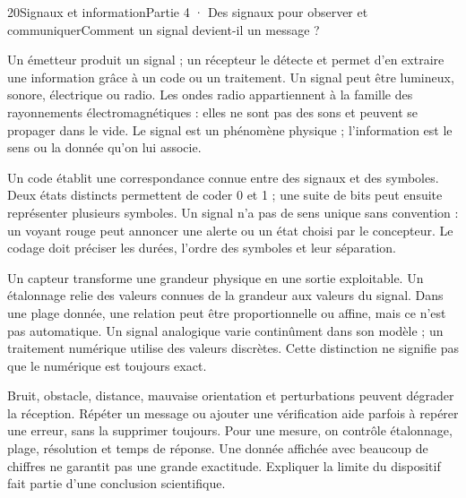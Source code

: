 \begin{ouverture}[college4]{20}{Signaux et information}{Partie 4 · Des signaux pour observer et communiquer}{Comment un signal devient-il un message ?}
\end{ouverture}
\label{ess-20}
Un émetteur produit un signal ; un récepteur le détecte et permet d’en extraire une information grâce à un code ou un traitement. Un signal peut être lumineux, sonore, électrique ou radio. Les ondes radio appartiennent à la famille des rayonnements électromagnétiques : elles ne sont pas des sons et peuvent se propager dans le vide. Le signal est un phénomène physique ; l’information est le sens ou la donnée qu’on lui associe.\par
{}
Un code établit une correspondance connue entre des signaux et des symboles. Deux états distincts permettent de coder 0 et 1 ; une suite de bits peut ensuite représenter plusieurs symboles. Un signal n’a pas de sens unique sans convention : un voyant rouge peut annoncer une alerte ou un état choisi par le concepteur. Le codage doit préciser les durées, l’ordre des symboles et leur séparation.\par
\clearpage
{}
Un capteur transforme une grandeur physique en une sortie exploitable. Un étalonnage relie des valeurs connues de la grandeur aux valeurs du signal. Dans une plage donnée, une relation peut être proportionnelle ou affine, mais ce n’est pas automatique. Un signal analogique varie continûment dans son modèle ; un traitement numérique utilise des valeurs discrètes. Cette distinction ne signifie pas que le numérique est toujours exact.\par
{}
Bruit, obstacle, distance, mauvaise orientation et perturbations peuvent dégrader la réception. Répéter un message ou ajouter une vérification aide parfois à repérer une erreur, sans la supprimer toujours. Pour une mesure, on contrôle étalonnage, plage, résolution et temps de réponse. Une donnée affichée avec beaucoup de chiffres ne garantit pas une grande exactitude. Expliquer la limite du dispositif fait partie d’une conclusion scientifique.\par
